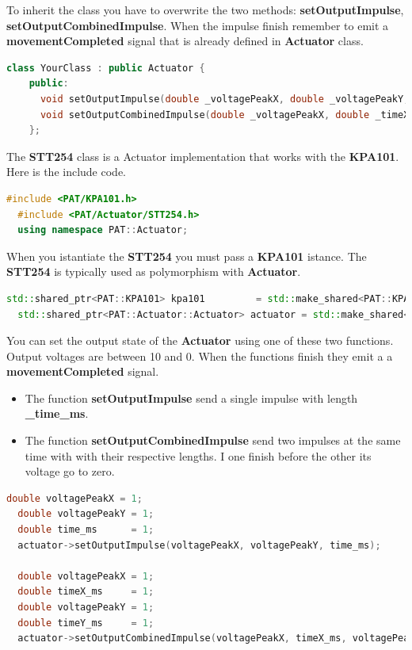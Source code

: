 To inherit the class you have to overwrite the two methods:
\textbf{setOutputImpulse}, \textbf{setOutputCombinedImpulse}. When the
impulse finish remember to emit a \textbf{movementCompleted} signal that
is already defined in \textbf{Actuator} class.

\begin{lstlisting}[language=c++, gobble=2]
  class YourClass : public Actuator {
    public:
      void setOutputImpulse(double _voltagePeakX, double _voltagePeakY, double _time_ms) override;
      void setOutputCombinedImpulse(double _voltagePeakX, double _timeX_ms, double _voltagePeakY, double _timeY_ms) override;
    };
\end{lstlisting}


The \textbf{STT254} class is a Actuator implementation that works with
the \textbf{KPA101}. Here is the include code.

\begin{lstlisting}[language=c++, gobble=2]
  #include <PAT/KPA101.h>
  #include <PAT/Actuator/STT254.h>
  using namespace PAT::Actuator;
\end{lstlisting}

When you istantiate the \textbf{STT254} you must pass a \textbf{KPA101}
istance. The \textbf{STT254} is typically used as polymorphism with
\textbf{Actuator}.

\begin{lstlisting}[language=c++, gobble=2]
  std::shared_ptr<PAT::KPA101> kpa101         = std::make_shared<PAT::KPA101>();
  std::shared_ptr<PAT::Actuator::Actuator> actuator = std::make_shared<PAT::Actuator::STT254>(kpa101);
\end{lstlisting}

You can set the output state of the \textbf{Actuator} using one of these
two functions. Output voltages are between 10 and 0. When the functions
finish they emit a a \textbf{movementCompleted} signal.

\begin{itemize}
  \tightlist
  \item
        The function \textbf{setOutputImpulse} send a single impulse with
        length \textbf{\_time\_ms}.
  \item
        The function \textbf{setOutputCombinedImpulse} send two impulses at
        the same time with with their respective lengths. I one finish before
        the other its voltage go to zero.
\end{itemize}

\begin{lstlisting}[language=c++, gobble=2]
  double voltagePeakX = 1;
  double voltagePeakY = 1;
  double time_ms      = 1;
  actuator->setOutputImpulse(voltagePeakX, voltagePeakY, time_ms);
  
  double voltagePeakX = 1;
  double timeX_ms     = 1;
  double voltagePeakY = 1;
  double timeY_ms     = 1;
  actuator->setOutputCombinedImpulse(voltagePeakX, timeX_ms, voltagePeakY, timeY_ms);
\end{lstlisting}



